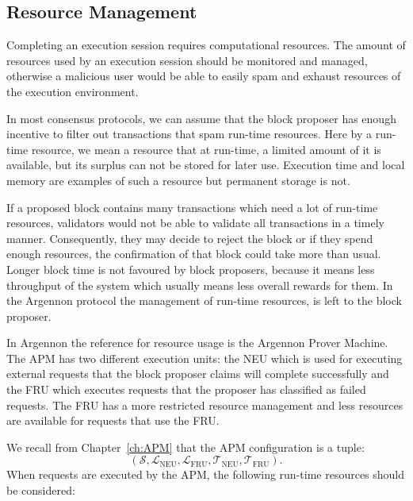 \subsection{Resource Management}\label{subsec:res-man}

Completing an execution session requires computational resources. The amount of resources used by an execution session
should be monitored and managed, otherwise a malicious user would be able to easily spam and exhaust resources of the
execution environment.

In most consensus protocols, we can assume that the block proposer has enough incentive to filter out transactions
that spam run-time resources. Here by a run-time resource, we mean a resource that at run-time, a limited amount
of it is available, but its surplus can not be stored for later use. Execution time and local memory are
examples of such a resource but permanent storage is not.

If a proposed block contains many transactions which need a lot of run-time resources, validators would not
be able to validate all transactions in a timely manner. Consequently, they may decide to reject the block or if they
spend enough resources, the confirmation of that block could take more than usual. Longer block time is not
favoured by block proposers, because it means less throughput of the system which usually means less overall rewards
for them. In the Argennon protocol the management of run-time resources, is left to the block proposer.

In Argennon the reference for resource usage is the Argennon Prover Machine. The APM has two different execution
units: the NEU which is used for executing external requests that the block proposer claims will complete
successfully and the FRU which executes requests that the proposer has classified as failed requests. The FRU has a
more restricted resource management and less resources are available for requests that use the FRU.

We recall from Chapter~\ref{ch:APM} that the APM configuration is a tuple:
\[
(\mathcal{S},\mathcal{L}_{\text{NEU}},\mathcal{L}_{\text{FRU}},\mathcal{T}_{\text{NEU}},\mathcal{T}_{\text{FRU}}).
\]
When requests are executed by the APM, the following run-time resources should be considered:

